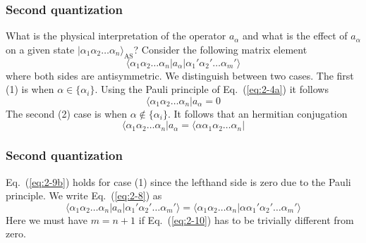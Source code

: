 \documentclass{beamer}
\begin{document}
\begin{frame}
\frametitle{Second quantization}

\begin{block}{}
What is the physical interpretation of the operator $a_\alpha$ and what is the effect of 
$a_\alpha$ on a given state $|\alpha_1\alpha_2\dots\alpha_n\rangle_{\mathrm{AS}}$? 
Consider the following matrix element
\begin{equation}
	\langle\alpha_1\alpha_2 \dots \alpha_n|a_\alpha|\alpha_1'\alpha_2' \dots \alpha_m'\rangle \label{eq:2-8}
\end{equation}
where both sides are antisymmetric. We  distinguish between two cases. The first (1) is when
$\alpha \in \{\alpha_i\}$. Using the Pauli principle of Eq.~(\ref{eq:2-4a}) it follows
\begin{equation}
		\langle\alpha_1\alpha_2 \dots \alpha_n|a_\alpha = 0 \label{eq:2-9a}
\end{equation}
The second (2) case is when $\alpha \notin \{\alpha_i\}$. It follows that an hermitian conjugation
\begin{equation}
		\langle \alpha_1\alpha_2 \dots \alpha_n|a_\alpha = \langle\alpha\alpha_1\alpha_2 \dots \alpha_n|  \label{eq:2-9b}
\end{equation}
\end{block}
\end{frame}

\begin{frame}
\frametitle{Second quantization}

\begin{block}{}
Eq.~(\ref{eq:2-9b}) holds for case (1) since the lefthand side is zero due to the Pauli principle. We write
Eq.~(\ref{eq:2-8}) as
\begin{equation}
	\langle\alpha_1\alpha_2 \dots \alpha_n|a_\alpha|\alpha_1'\alpha_2' \dots \alpha_m'\rangle = 
	\langle \alpha_1\alpha_2 \dots \alpha_n|\alpha\alpha_1'\alpha_2' \dots \alpha_m'\rangle \label{eq:2-10}
\end{equation}
Here we must have $m = n+1$ if Eq.~(\ref{eq:2-10}) has to be trivially different from zero.
\end{block}
\end{frame}
\end{document}
